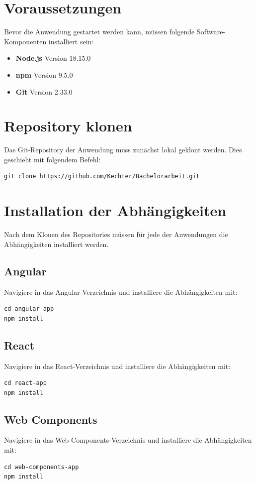\documentclass[oneside]{ausarbeitung}
\begin{document}
\section{Voraussetzungen}
Bevor die Anwendung gestartet werden kann, müssen folgende Software-Komponenten installiert sein:
\begin{itemize}
    \item \textbf{Node.js} Version 18.15.0
    \item \textbf{npm} Version 9.5.0 
    \item \textbf{Git} Version 2.33.0
\end{itemize}

\section{Repository klonen}
Das Git-Repository der Anwendung muss zunächst lokal geklont werden. Dies geschieht mit folgendem Befehl:
\begin{verbatim}
git clone https://github.com/Kechter/Bachelorarbeit.git
\end{verbatim}

\section{Installation der Abhängigkeiten}
Nach dem Klonen des Repositories müssen für jede der Anwendungen die Abhängigkeiten installiert werden. 

\subsection{Angular}
Navigiere in das Angular-Verzeichnis und installiere die Abhängigkeiten mit:
\begin{verbatim}
cd angular-app
npm install
\end{verbatim}

\subsection{React}
Navigiere in das React-Verzeichnis und installiere die Abhängigkeiten mit:
\begin{verbatim}
cd react-app
npm install
\end{verbatim}

\subsection{Web Components}
Navigiere in das Web Components-Verzeichnis und installiere die Abhängigkeiten mit:
\begin{verbatim}
cd web-components-app
npm install
\end{verbatim}
\end{document}
